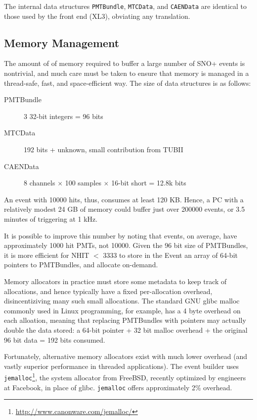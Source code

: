 \documentclass[11pt,twocolumn]{article}
\begin{document}
The internal data structures {\tt PMTBundle}, {\tt MTCData}, and {\tt CAENData} are identical to those used by the front end (XL3), obviating any translation.

\subsection{Memory Management}
The amount of of memory required to buffer a large number of SNO+ events is nontrivial, and much care must be taken to ensure that memory is managed in a thread-safe, fast, and space-efficient way. The size of data structures is as follows:
\begin{description}
\item[PMTBundle] 3 32-bit integers = 96 bits
\item[MTCData] 192 bits + unknown, small contribution from TUBII
\item[CAENData] 8 channels $\times$ 100 samples $\times$ 16-bit short = 12.8k bits
\end{description}
An event with 10000 hits, thus, consumes at least 120 KB. Hence, a PC with a relatively modest 24 GB of memory could buffer just over 200000 events, or 3.5 minutes of triggering at 1 kHz.

It is possible to improve this number by noting that events, on average, have approximately 1000 hit PMTs, not 10000. Given the 96 bit size of PMTBundles, it is more efficient for NHIT $<$ 3333 to store in the Event an array of 64-bit pointers to PMTBundles, and allocate on-demand.

Memory allocators in practice must store some metadata to keep track of allocations, and hence typically have a fixed per-allocation overhead, disincentiziving many such small allocations. The standard GNU glibc malloc commonly used in Linux programming, for example, has a 4 byte overhead on each alloation, meaning that replacing PMTBundles with pointers may actually double the data stored: a 64-bit pointer + 32 bit malloc overhead + the original 96 bit data = 192 bits consumed.

Fortunately, alternative memory allocators exist with much lower overhead (and vastly superior performance in threaded applications). The event builder uses {\tt jemalloc}\footnote{\href{http://www.canonware.com/jemalloc/}{http://www.canonware.com/jemalloc/}}, the system allocator from FreeBSD, recently optimized by engineers at Facebook, in place of glibc. {\tt jemalloc} offers approximately 2\% overhead.
\end{document}
